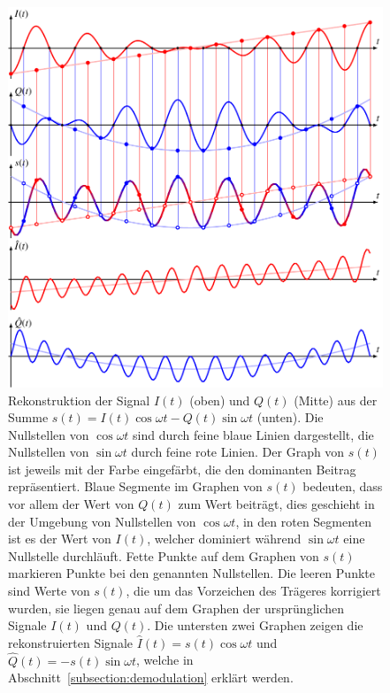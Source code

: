\begin{figure}
\centering
\includegraphics{applications/qam/images/sep.pdf}
\caption{Rekonstruktion der Signal $I(t)$ (oben) und $Q(t)$ (Mitte)
aus der Summe $s(t) = I(t)\cos\omega t - Q(t)\sin\omega t$ (unten).
Die Nullstellen von $\cos\omega t$ sind durch feine blaue Linien 
dargestellt, die Nullstellen von $\sin\omega t$ durch feine rote Linien.
Der Graph von $s(t)$ ist jeweils mit der Farbe eingefärbt, die den
dominanten Beitrag repräsentiert.
Blaue Segmente im Graphen von $s(t)$ bedeuten, dass vor allem der Wert
von $Q(t)$ zum Wert beiträgt, dies geschieht in der Umgebung von
Nullstellen von $\cos\omega t$, in den roten Segmenten ist es der Wert von
$I(t)$, welcher dominiert während $\sin\omega t$ eine Nullstelle durchläuft.
Fette Punkte auf dem Graphen von $s(t)$ markieren Punkte bei den
genannten Nullstellen.
Die leeren Punkte sind Werte von $s(t)$, die um das Vorzeichen des
Trägeres korrigiert wurden, sie liegen genau auf dem Graphen der
ursprünglichen Signale $I(t)$ und $Q(t)$.
Die untersten zwei Graphen zeigen die rekonstruierten Signale
$\hat{I}(t)=s(t) \cos\omega t$ und $\hat{Q}(t) = -s(t) \sin\omega t$, 
welche in Abschnitt~\ref{subsection:demodulation} erklärt werden.
\label{figure:qam:sep}}
\end{figure}

